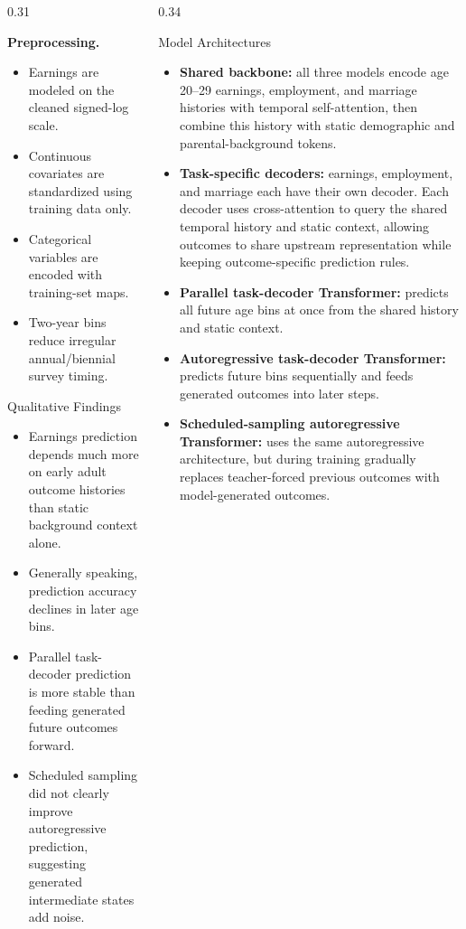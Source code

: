 \documentclass[final]{beamer}
\newcommand{\posterblock}[2]{
  \begin{block}{#1}
  #2
  \end{block}
}
\begin{document}
\begin{frame}[t]
\begin{columns}[t,totalwidth=\textwidth]
\begin{column}{0.31\textwidth}
{\vspace{0.5em}
\textbf{Preprocessing.}
\begin{itemize}
  \item Earnings are modeled on the cleaned signed-log scale.
  \item Continuous covariates are standardized using training data only.
  \item Categorical variables are encoded with training-set maps.
  \item Two-year bins reduce irregular annual/biennial survey timing.
\end{itemize}
}

\posterblock{Qualitative Findings}{
\begin{itemize}
  \item Earnings prediction depends much more on early adult outcome histories than static background context alone.
  \item Generally speaking, prediction accuracy declines in later age bins.
  \item Parallel task-decoder prediction is more stable than feeding generated future outcomes forward.
  \item Scheduled sampling did not clearly improve autoregressive prediction, suggesting generated intermediate states add noise.
\end{itemize}
}

\end{column}

\begin{column}{0.34\textwidth}

\posterblock{Model Architectures}{
\begin{itemize}
  \item \textbf{Shared backbone:} all three models encode age 20--29 earnings, employment, and marriage histories with temporal self-attention, then combine this history with static demographic and parental-background tokens.
  \item \textbf{Task-specific decoders:} earnings, employment, and marriage each have their own decoder. Each decoder uses cross-attention to query the shared temporal history and static context, allowing outcomes to share upstream representation while keeping outcome-specific prediction rules.
  \item \textbf{Parallel task-decoder Transformer:} predicts all future age bins at once from the shared history and static context.
  \item \textbf{Autoregressive task-decoder Transformer:} predicts future bins sequentially and feeds generated outcomes into later steps.
  \item \textbf{Scheduled-sampling autoregressive Transformer:} uses the same autoregressive architecture, but during training gradually replaces teacher-forced previous outcomes with model-generated outcomes.
\end{itemize}

}
\end{column}
\end{columns}
\end{frame}
\end{document}
